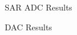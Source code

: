 \documentclass[10pt, aspectratio=169]{beamer}
\begin{document}
\begin{frame}{SAR ADC Results}
\centering
\resizebox{0.85\linewidth}{!}{}
\vspace{0.2cm}


\end{frame}

\begin{frame}{DAC Results}
\centering
\resizebox{0.9\linewidth}{!}{}
\vspace{0.2cm}


\end{frame}

\end{document}
